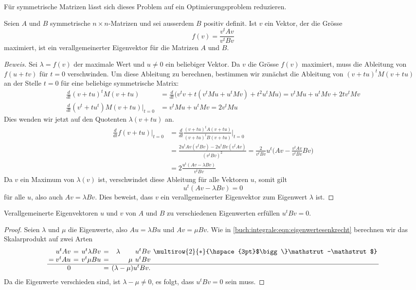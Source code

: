 Für symmetrische Matrizen lässt sich dieses Problem auf ein 
Optimierungsproblem reduzieren.

\begin{satz}
Seien $A$ und $B$ symmetrische $n\times n$-Matrizen und sei ausserdem
$B$ positiv definit.
Ist $v$ ein Vektor, der die Grösse
\[
f(v)=\frac{v^tAv}{v^tBv}
\]
maximiert, ist ein verallgemeinerter Eigenvektor für die Matrizen $A$
und $B$.
\end{satz}

\begin{proof}[Beweis]
Sei $\lambda = f(v)$ der maximale Wert und $u\ne 0$ ein beliebiger Vektor. 
Da $v$ die Grösse $f(v)$ maximiert, muss die Ableitung
von $f(u+tv)$ für $t=0$ verschwinden.
Um diese Ableitung zu berechnen, bestimmen wir zunächst die Ableitung
von $(v+tu)^tM(v+tu)$  an der Stelle $t=0$ für eine beliebige
symmetrische Matrix:
\begin{align*}
\frac{d}{dt}
(v+tu)^tM(v+tu)
&=
\frac{d}{dt}\bigl(
v^tv + t(v^tMu+u^tMv) + t^2 u^tMu
\bigr)
=
v^tMu+u^tMv + 2tv^tMv
\\
\frac{d}{dt}
(v^t+tu^t)M(v+tu)
\bigg|_{t=0}
&=
v^tMu+u^tMv
=
2v^tMu
\end{align*}
Dies wenden wir jetzt auf den Quotenten $\lambda(v+tu)$ an.
\begin{align*}
\frac{d}{dt}f(v+tu)\bigg|_{t=0}
&=
\frac{d}{dt}
\frac{(v+tu)^tA(v+tu)}{(v+tu)^tB(v+tu)}\bigg|_{t=0}
\\
&=
\frac{2u^tAv(v^tBv) - 2u^tBv(v^tAv)}{(v^tBv)^2}
=
\frac{2}{v^tBv}
u^t
\biggl(
Av - \frac{v^tAv}{v^tBv} Bv
\biggr)
\\
&=
2
\frac{
u^t(
Av - \lambda Bv
)
}{v^tBv}
\end{align*}
Da $v$ ein Maximum von $\lambda(v)$ ist, verschwindet diese Ableitung
für alle Vektoren $u$, somit gilt
\[
u^t(Av-\lambda Bv)=0
\]
für alle $u$, also auch $Av=\lambda Bv$.
Dies beweist, dass $v$ ein verallgemeinerter Eigenvektor zum
Eigenwert $\lambda$ ist.
\end{proof}

\begin{satz}
Verallgemeinerte Eigenvektoren $u$ und $v$ von $A$ und $B$
zu verschiedenen Eigenwerten erfüllen $u^tBv=0$.
\end{satz}

\begin{proof}
Seien $\lambda$ und $\mu$ die Eigenwerte, also $Au=\lambda Bu$
und $Av=\mu Bv$.
Wie in \eqref{buch:integrale:eqn:eigenwertesenkrecht}
berechnen wir das Skalarprodukt auf zwei Arten
\[
\renewcommand{\arraycolsep}{2pt}
\begin{array}{rcccrl}
 u^tAv &=&u^t\lambda Bv &=& \lambda\phantom{\mathstrut-\mu)} u^tBv
	&\multirow{2}{*}{\hspace{3pt}$\bigg\}\mathstrut-\mathstrut$}\\
=v^tAu &=&v^t\mu Bu     &=&  \mu\phantom{)}u^tBv         &\\
\hline
     0 & &              &=& (\lambda - \mu)u^tBv.        &
\end{array}
\]
Da die Eigenwerte verschieden sind, ist $\lambda-\mu\ne 0$, es folgt, 
dass $u^tBv=0$ sein muss.
\end{proof}

